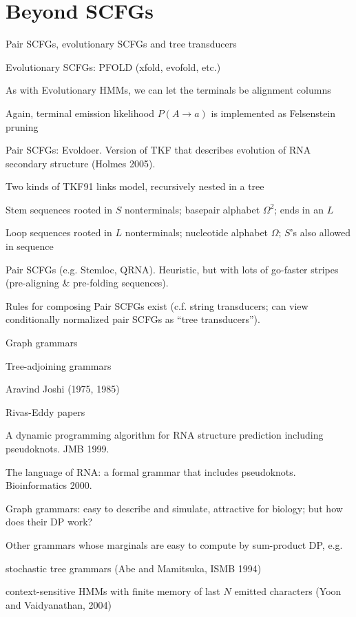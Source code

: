 \documentclass{beamer}
\begin{document}
\section{Beyond SCFGs}

\begin{frame}{Pair SCFGs, evolutionary SCFGs and tree transducers}

\itemb
\item Evolutionary SCFGs: PFOLD (xfold, evofold, etc.)
 \itemb
 \item As with Evolutionary HMMs, we can let the terminals be alignment columns
 \item Again, terminal emission likelihood $P(A \to a)$ is implemented as Felsenstein pruning
 \iteme
\iteme
\end{frame}
\begin{frame}{}
\itemb
\item Pair SCFGs: Evoldoer. Version of TKF that describes evolution of RNA secondary structure (Holmes 2005).
 \itemb
 \item Two kinds of TKF91 links model, recursively nested in a tree
 \item Stem sequences rooted in $S$ nonterminals; basepair alphabet $\Omega^2$; ends in an $L$
 \item Loop sequences rooted in $L$ nonterminals; nucleotide alphabet $\Omega$; $S$'s also allowed in sequence
 \iteme
\item Pair SCFGs (e.g. Stemloc, QRNA). Heuristic, but with lots of go-faster stripes (pre-aligning \& pre-folding sequences).
\item Rules for composing Pair SCFGs exist (c.f. string transducers; can view conditionally normalized pair SCFGs as ``tree transducers'').
\iteme

\end{frame}

\begin{frame}{Graph grammars}

\itemb
\item Tree-adjoining grammars
 \itemb
 \item Aravind Joshi (1975, 1985)
 \iteme
\item Rivas-Eddy papers
 \itemb
 \item A dynamic programming algorithm for RNA structure prediction including pseudoknots. JMB 1999.
 \item The language of RNA: a formal grammar that includes pseudoknots. Bioinformatics 2000.
 \iteme
\item Graph grammars: easy to describe and simulate, attractive for biology; but how does their DP work?
\item Other grammars whose marginals are easy to compute by sum-product DP, e.g.
 \itemb
 \item stochastic tree grammars (Abe and Mamitsuka, ISMB 1994)
 \item context-sensitive HMMs with finite memory of last $N$ emitted characters (Yoon and Vaidyanathan, 2004)
 \iteme
\iteme

\end{frame}
\end{document}
